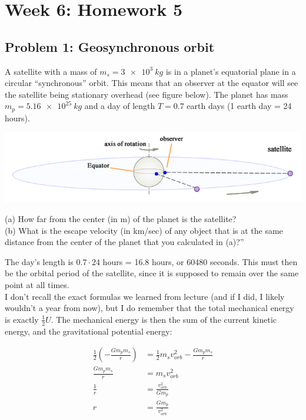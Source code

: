 \documentclass[8.01x]{subfiles}
\begin{document}
\chapter{Week 6: Homework 5}

\section{Problem 1: Geosynchronous orbit}

A satellite with a mass of $m_s = \SI{3e3}{kg}$ is in a planet's equatorial plane in a circular ``synchronous'' orbit. This means that an observer at the equator will see the satellite being stationary overhead (see figure below). The planet has mass $m_p = \SI{5.16e25}{kg}$ and a day of length $T = 0.7$ earth days (1 earth day = 24 hours).

\begin{center}
\includegraphics[scale=0.6]{Graphics/h5p1}
\end{center}

(a) How far from the center (in m) of the planet is the satellite?\\
(b) What is the escape velocity (in km/sec) of any object that is at the same distance from the center of the planet that you calculated in (a)?''

The day's length is $0.7 \cdot 24$ hours = 16.8 hours, or 60480 seconds. This must then be the orbital period of the satellite, since it is supposed to remain over the same point at all times.\\
I don't recall the exact formulas we learned from lecture (and if I did, I likely wouldn't a year from now), but I do remember that the total mechanical energy is exactly $\frac{1}{2} U$. The mechanical energy is then the sum of the current kinetic energy, and the gravitational potential energy:

\begin{align}
\frac{1}{2} \left(-\frac{G m_p m_s}{r}\right) &= \frac{1}{2} m_s v_{orb}^2 - \frac{G m_p m_s}{r}\\
\frac{G m_p m_s}{r} &= m_s v_{orb}^2\\
\frac{1}{r} &= \frac{v_{orb}^2}{G m_p}\\
r &= \frac{G m_p}{v_{orb}^2}
\end{align}
\end{document}
